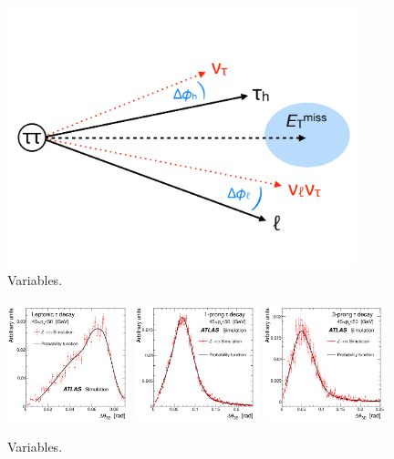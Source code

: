 \begin{figure}[tp]
  \centering
  \includegraphics[width=0.90\textwidth]{figures/mtautau/mmc-cartoon}
  \caption{Variables.}
  \label{fig:strategy-mtautau-cartoon}
\end{figure}

\begin{figure}[tp]
  \centering
  \includegraphics[width=0.32\textwidth]{figures/ATLAS-CONF-2011-132/fig_01a}
  \includegraphics[width=0.32\textwidth]{figures/ATLAS-CONF-2011-132/fig_01b}
  \includegraphics[width=0.32\textwidth]{figures/ATLAS-CONF-2011-132/fig_01c}
  \caption{Variables.}
  \label{fig:strategy-mtautau-inputs}
\end{figure}

